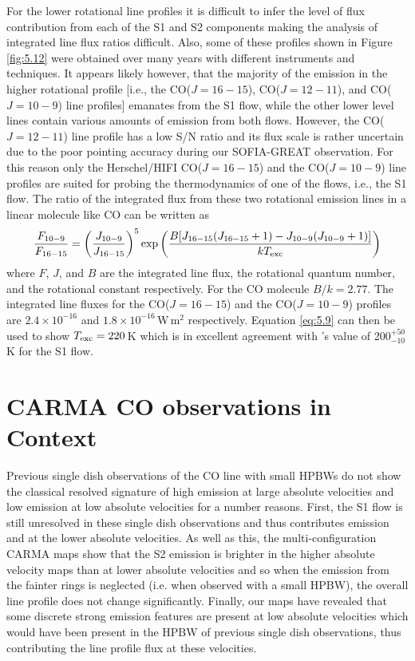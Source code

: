 For the lower rotational line profiles it is difficult to infer the level of flux contribution from each of the S1 and S2 components making the analysis of integrated line flux ratios difficult. Also, some of these profiles shown in Figure \ref{fig:5.12} were obtained over many years with different instruments and techniques. It appears likely however, that the majority of the emission in the higher rotational profile [i.e., the CO($J=16-15$), CO($J=12-11$), and CO($J=10-9$) line profiles] emanates from the S1 flow, while the other lower level lines contain various amounts of emission from both flows. However, the CO($J=12-11$) line profile has a low S/N ratio and its flux scale is rather uncertain due to the poor pointing accuracy during our SOFIA-GREAT observation. For this reason only the Herschel/HIFI CO($J=16-15$) and the CO($J=10-9$) line profiles are suited for probing the thermodynamics of one of the flows, i.e., the S1 flow. The ratio of the integrated flux from these two rotational emission lines in a linear molecule like CO can be written as 
\begin{equation}
\frac{F_{10-9}}{F_{16-15}}=\left(\frac{J_{10-9}}{J_{16-15}} \right)^5 \mathrm{exp}\left(\frac{B[J_{16-15}(J_{16-15}+1)-J_{10-9}(J_{10-9} +1)]}{kT_{\rm{exc}}} \right)
\label{eq:5.9}
\end{equation}
where $F$, $J$, and $B$ are the integrated line flux, the rotational quantum number, and the rotational constant respectively. For the CO molecule $B/k = 2.77$. The integrated line fluxes for the CO($J=16-15$) and the CO($J=10-9$) profiles are $2.4\times 10^{-16}$  and $1.8\times 10^{-16}$\,W\,m$^2$ respectively. Equation \ref{eq:5.9} can then be used to show $T_{\rm{exc}} = 220$\,K which is in excellent agreement with \citeauthor{bernat_1979}'s \citeyear{bernat_1979} value of 200$^{+50}_{-10}$\,K for the S1 flow.

\section{CARMA CO observations in Context}\label{sec:5.11}
Previous single dish observations of the CO line with small HPBWs do not show the classical resolved signature of high emission at large absolute velocities and low emission at low absolute velocities for a number reasons. First, the S1 flow is still unresolved in these single dish observations and thus contributes emission and at the lower absolute velocities. As well as this, the multi-configuration CARMA maps show that the S2 emission is brighter in the higher absolute velocity maps than at lower absolute velocities and so when the emission from the fainter rings is neglected (i.e. when observed with a small HPBW), the overall line profile does not change significantly. Finally, our maps have revealed that some discrete strong emission features are present at low absolute velocities which would have been present in the HPBW of previous single dish observations, thus contributing the line profile flux at these velocities.


